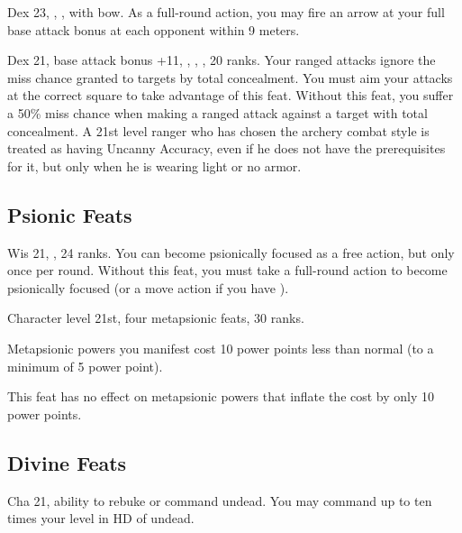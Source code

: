 {Dex 23, , ,  with bow.}
{As a full-round action, you may fire an arrow at your full base attack bonus at each opponent within 9 meters.}

{}
{Dex 21, base attack bonus +11, , , ,  20 ranks.}
{Your ranged attacks ignore the miss chance granted to targets by total concealment. You must aim your attacks at the correct square to take advantage of this feat.}
{Without this feat, you suffer a 50\% miss chance when making a ranged attack against a target with total concealment.}
{A 21st level ranger who has chosen the archery combat style is treated as having Uncanny Accuracy, even if he does not have the prerequisites for it, but only when he is wearing light or no armor.}






\subsection{Psionic Feats}
{}
{Wis 21, ,  24 ranks.}
{You can become psionically focused as a free action, but only once per round.}
{Without this feat, you must take a full-round action to become psionically focused (or a move action if you have ).}
{}

{Character level 21st, four metapsionic feats,  30 ranks.}
{Metapsionic powers you manifest cost 10 power points less than normal (to a minimum of 5 power point).

This feat has no effect on metapsionic powers that inflate the cost by only 10 power points.}




\subsection{Divine Feats}
{Cha 21, ability to rebuke or command undead.}
{You may command up to ten times your level in HD of undead.}

